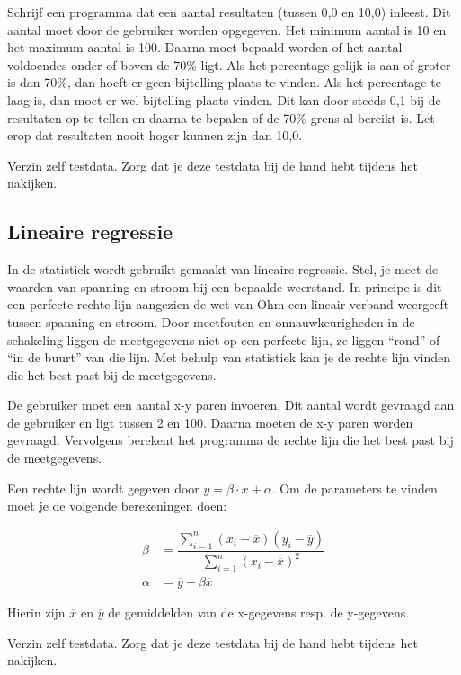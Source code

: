 \documentclass[a4paper,10pt,fleqn,twoside]{article}
\begin{document}
Schrijf een programma dat een aantal resultaten (tussen 0,0 en 10,0) inleest. Dit aantal moet door de gebruiker worden opgegeven. Het minimum aantal is 10 en het maximum aantal is 100. Daarna moet bepaald worden of het aantal voldoendes onder of boven de 70\% ligt. Als het percentage gelijk is aan of groter is dan 70\%, dan hoeft er geen bijtelling plaats te vinden. Als het percentage te laag is, dan moet er wel bijtelling plaats vinden. Dit kan door steeds 0,1 bij de resultaten op te tellen en daarna te bepalen of de 70\%-grens al bereikt is. Let erop dat resultaten nooit hoger kunnen zijn dan 10,0.

Verzin zelf testdata. Zorg dat je deze testdata bij de hand hebt tijdens het nakijken.

\subsection{Lineaire regressie}
In de statistiek wordt gebruikt gemaakt van lineaire regressie. Stel, je meet de waarden van spanning en stroom bij een bepaalde weerstand. In principe is dit een perfecte rechte lijn aangezien de wet van Ohm een lineair verband weergeeft tussen spanning en stroom. Door meetfouten en onnauwkeurigheden in de schakeling liggen de meetgegevens niet op een perfecte lijn, ze liggen ``rond'' of ``in de buurt'' van die lijn. Met behulp van statistiek kan je de rechte lijn vinden die het best past bij de meetgegevens.

De gebruiker moet een aantal x-y paren invoeren. Dit aantal wordt gevraagd aan de gebruiker en ligt tussen 2 en 100. Daarna moeten de x-y paren worden gevraagd. Vervolgens berekent het programma de rechte lijn die het best past bij de meetgegevens. 

Een rechte lijn wordt gegeven door $y = \beta\cdot x + \alpha$. Om de parameters te vinden moet je de volgende berekeningen doen:

\begin{align*}
\beta &= \dfrac{\sum\limits_{i=1}^{n}\left(x_i-\overline{x}\right)\left(y_i-\overline{y}\right)}{\sum\limits_{i=1}^{n}\left(x_i-\overline{x}\right)^2} \\
\alpha &= \overline{y} - \beta\overline{x}
\end{align*}


Hierin zijn $\overline{x}$ en $\overline{y}$ de gemiddelden van de x-gegevens resp. de y-gegevens.

Verzin zelf testdata. Zorg dat je deze testdata bij de hand hebt tijdens het nakijken.
\end{document}
